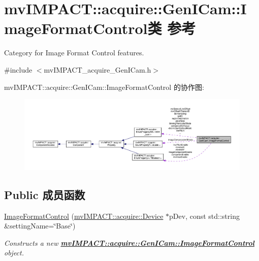 \hypertarget{classmv_i_m_p_a_c_t_1_1acquire_1_1_gen_i_cam_1_1_image_format_control}{\section{mv\+I\+M\+P\+A\+C\+T\+:\+:acquire\+:\+:Gen\+I\+Cam\+:\+:Image\+Format\+Control类 参考}
\label{classmv_i_m_p_a_c_t_1_1acquire_1_1_gen_i_cam_1_1_image_format_control}
}


Category for Image Format Control features.  




{\ttfamily \#include $<$mv\+I\+M\+P\+A\+C\+T\+\_\+acquire\+\_\+\+Gen\+I\+Cam.\+h$>$}



mv\+I\+M\+P\+A\+C\+T\+:\+:acquire\+:\+:Gen\+I\+Cam\+:\+:Image\+Format\+Control 的协作图\+:
\nopagebreak
\begin{figure}[H]
\begin{center}
\leavevmode
\includegraphics[width=350pt]{classmv_i_m_p_a_c_t_1_1acquire_1_1_gen_i_cam_1_1_image_format_control__coll__graph}
\end{center}
\end{figure}
\subsection*{Public 成员函数}
\begin{DoxyCompactItemize}
\item 
\hyperlink{classmv_i_m_p_a_c_t_1_1acquire_1_1_gen_i_cam_1_1_image_format_control_a4588e35f52c727616fad4f7331d625a7}{Image\+Format\+Control} (\hyperlink{classmv_i_m_p_a_c_t_1_1acquire_1_1_device}{mv\+I\+M\+P\+A\+C\+T\+::acquire\+::\+Device} $\ast$p\+Dev, const std\+::string \&setting\+Name=\char`\"{}Base\char`\"{})
\begin{DoxyCompactList}\small\item\em Constructs a new {\bfseries \hyperlink{classmv_i_m_p_a_c_t_1_1acquire_1_1_gen_i_cam_1_1_image_format_control}{mv\+I\+M\+P\+A\+C\+T\+::acquire\+::\+Gen\+I\+Cam\+::\+Image\+Format\+Control}} object. \end{DoxyCompactList}\end{DoxyCompactItemize}
